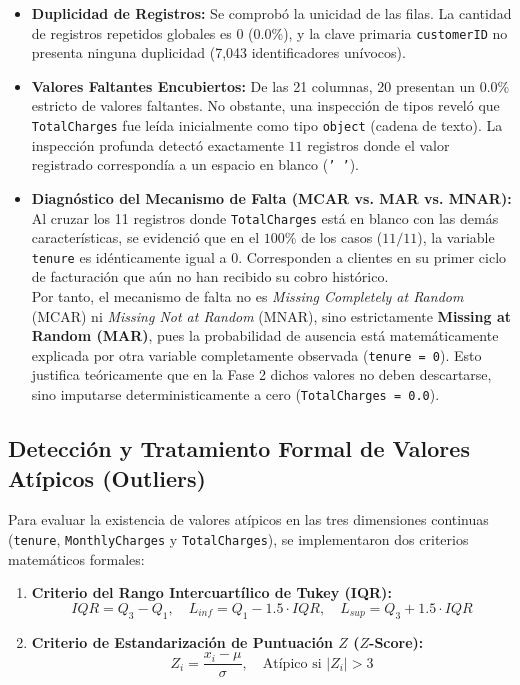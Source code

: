 \documentclass[11pt,letterpaper]{article}
\begin{document}
\begin{itemize}
    \item \textbf{Duplicidad de Registros:} Se comprobó la unicidad de las filas. La cantidad de registros repetidos globales es $0$ ($0.0\%$), y la clave primaria \texttt{customerID} no presenta ninguna duplicidad (7,043 identificadores unívocos).
    \item \textbf{Valores Faltantes Encubiertos:} De las 21 columnas, 20 presentan un $0.0\%$ estricto de valores faltantes. No obstante, una inspección de tipos reveló que \texttt{TotalCharges} fue leída inicialmente como tipo \texttt{object} (cadena de texto). La inspección profunda detectó exactamente $11$ registros donde el valor registrado correspondía a un espacio en blanco (\texttt{' '}).
    \item \textbf{Diagnóstico del Mecanismo de Falta (MCAR vs. MAR vs. MNAR):}\\
    Al cruzar los 11 registros donde \texttt{TotalCharges} está en blanco con las demás características, se evidenció que en el $100\%$ de los casos ($11/11$), la variable \texttt{tenure} es idénticamente igual a $0$. Corresponden a clientes en su primer ciclo de facturación que aún no han recibido su cobro histórico.\\
    Por tanto, el mecanismo de falta no es \textit{Missing Completely at Random} (MCAR) ni \textit{Missing Not at Random} (MNAR), sino estrictamente \textbf{Missing at Random (MAR)}, pues la probabilidad de ausencia está matemáticamente explicada por otra variable completamente observada (\texttt{tenure = 0}). Esto justifica teóricamente que en la Fase 2 dichos valores no deben descartarse, sino imputarse deterministicamente a cero (\texttt{TotalCharges = 0.0}).
\end{itemize}

\subsection{Detección y Tratamiento Formal de Valores Atípicos (Outliers)}
Para evaluar la existencia de valores atípicos en las tres dimensiones continuas (\texttt{tenure}, \texttt{MonthlyCharges} y \texttt{TotalCharges}), se implementaron dos criterios matemáticos formales:

\begin{enumerate}
    \item \textbf{Criterio del Rango Intercuartílico de Tukey (IQR):}
    \begin{equation}
        IQR = Q_3 - Q_1, \quad L_{inf} = Q_1 - 1.5 \cdot IQR, \quad L_{sup} = Q_3 + 1.5 \cdot IQR
    \end{equation}
    \item \textbf{Criterio de Estandarización de Puntuación $Z$ ($Z$-Score):}
    \begin{equation}
        Z_i = \frac{x_i - \mu}{\sigma}, \quad \text{Atípico si } |Z_i| > 3
    \end{equation}
\end{enumerate}
\end{document}
